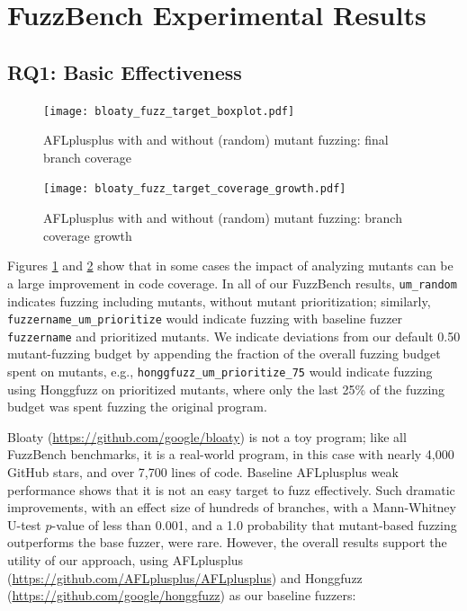 \section{FuzzBench Experimental Results}

\subsection{RQ1: Basic Effectiveness}

\begin{figure}
  \texttt{[image: bloaty\_fuzz\_target\_boxplot.pdf]}
  \caption{AFLplusplus with and without (random) mutant fuzzing: final branch coverage}
  \label{fig:bloatybox}
  
\end{figure}

\begin{figure}
  \texttt{[image: bloaty\_fuzz\_target\_coverage\_growth.pdf]}
  \caption{AFLplusplus with and without (random) mutant fuzzing: branch coverage growth}
  \label{fig:bloatygrowth}  
  \end{figure}

  Figures \ref{fig:bloatybox} and \ref{fig:bloatygrowth} show that in some cases the impact of analyzing mutants can be a large improvement in code coverage.  In all of our FuzzBench results, {\tt um\_random} indicates fuzzing including mutants, without mutant prioritization; similarly, {\tt fuzzername\_um\_prioritize} would indicate fuzzing with baseline fuzzer {\tt fuzzername} and prioritized mutants.  We indicate deviations from our default 0.50 mutant-fuzzing budget by appending the fraction of the overall fuzzing budget spent on mutants, e.g., {\tt honggfuzz\_um\_prioritize\_75} would indicate fuzzing using Honggfuzz on prioritized mutants, where only the last 25\% of the fuzzing budget was spent fuzzing the original program.

Bloaty (\url{https://github.com/google/bloaty}) is not a toy program; like all FuzzBench benchmarks, it is a real-world program, in this case with nearly 4,000 GitHub stars, and over 7,700 lines of code.  Baseline AFLplusplus weak performance shows that it is not an easy target to fuzz effectively.  Such dramatic improvements, with an effect size of hundreds of branches, with a Mann-Whitney U-test $p$-value of less than 0.001, and a 1.0 probability that mutant-based fuzzing outperforms the base fuzzer, were rare.  However, the overall results support the utility of our approach, using AFLplusplus (\url{https://github.com/AFLplusplus/AFLplusplus}) and Honggfuzz (\url{https://github.com/google/honggfuzz}) as our baseline fuzzers:

